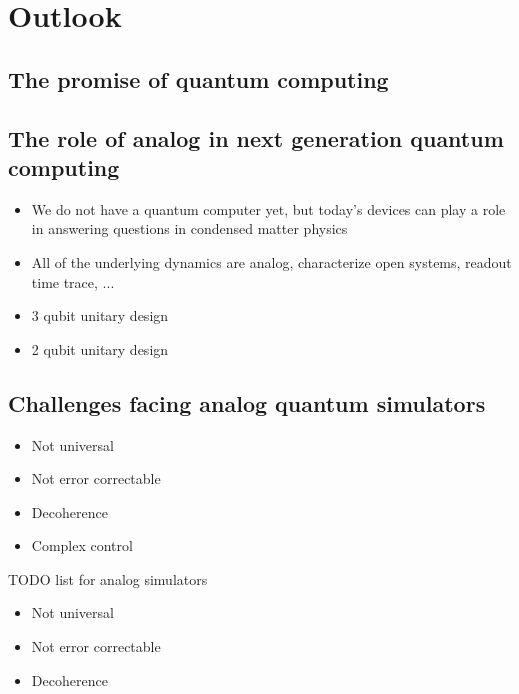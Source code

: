 \chapter[Outlook]{Outlook}

\section{The promise of quantum computing}

\section{The role of analog in next generation quantum computing}
\begin{itemize}
\item We do not have a quantum computer yet, but today's devices can play a role in answering questions in condensed matter physics
\item All of the underlying dynamics are analog, characterize open systems, readout time trace, ...
\item 3 qubit unitary design
\item 2 qubit unitary design
\end{itemize}


\section{Challenges facing analog quantum simulators}

\begin{itemize}
\item Not universal
\item Not error correctable
\item Decoherence
\item Complex control
\end{itemize}

TODO list for analog simulators
\begin{itemize}
    \item Not universal
    \item Not error correctable
    \item Decoherence
\end{itemize}



